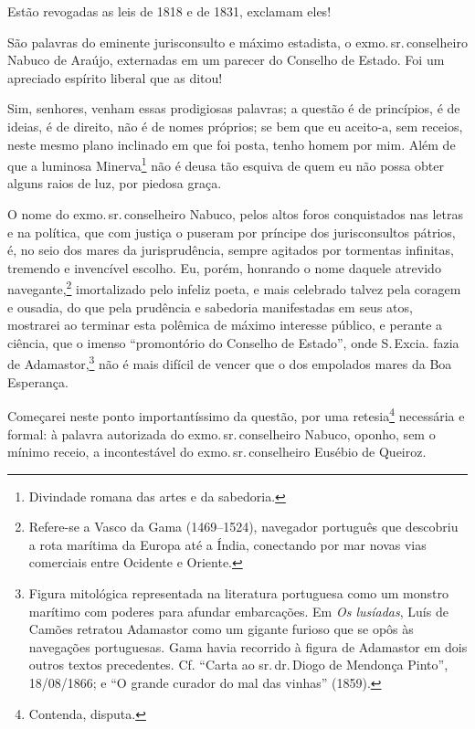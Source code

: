 Estão revogadas as leis de 1818 e de 1831, exclamam eles!

São palavras do eminente jurisconsulto e máximo estadista, o exmo.\,sr.\,conselheiro Nabuco de Araújo, externadas em um parecer do Conselho de
Estado. Foi um apreciado espírito liberal que as ditou!

Sim, senhores, venham essas prodigiosas palavras; a questão é de
princípios, é de ideias, é de direito, não é de nomes próprios; se bem
que eu aceito-a, sem receios, neste mesmo plano inclinado em que foi
posta, tenho homem por mim. Além de que a luminosa Minerva\footnote{
  Divindade romana das artes e da sabedoria.} não é deusa tão esquiva de
quem eu não possa obter alguns raios de luz, por piedosa graça.

O nome do exmo.\,sr.\,conselheiro Nabuco, pelos altos foros conquistados
nas letras e na política, que com justiça o puseram por príncipe dos
jurisconsultos pátrios, é, no seio dos mares da jurisprudência, sempre
agitados por tormentas infinitas, tremendo e invencível escolho. Eu,
porém, honrando o nome daquele atrevido navegante,\footnote{Refere-se a
  Vasco da Gama (1469--1524), navegador português que descobriu a rota
  marítima da Europa até a Índia, conectando por mar novas vias
  comerciais entre Ocidente e Oriente.} imortalizado pelo infeliz
poeta, e mais celebrado talvez pela coragem e ousadia, do que pela
prudência e sabedoria manifestadas em seus atos, mostrarei ao terminar
esta polêmica de máximo interesse público, e perante a ciência, que o
imenso ``promontório do Conselho de Estado'', onde S.\,Excia. fazia de
Adamastor,\footnote{Figura mitológica representada na literatura
  portuguesa como um monstro marítimo com poderes para afundar
  embarcações. Em \emph{Os lusíadas}, Luís de Camões retratou Adamastor
  como um gigante furioso que se opôs às navegações portuguesas. Gama
  havia recorrido à figura de Adamastor em dois outros textos
  precedentes. Cf. ``Carta ao sr.\,dr.\,Diogo de Mendonça Pinto'',
  18/08/1866; e ``O grande curador do mal das vinhas'' (1859).} não
é mais difícil de vencer que o dos empolados mares da Boa Esperança.

Começarei neste ponto importantíssimo da questão, por uma
retesia\footnote{Contenda, disputa.} necessária e formal: à palavra
autorizada do exmo.\,sr.\,conselheiro Nabuco, oponho, sem o mínimo receio,
a incontestável do exmo.\,sr.\,conselheiro Eusébio de Queiroz.

